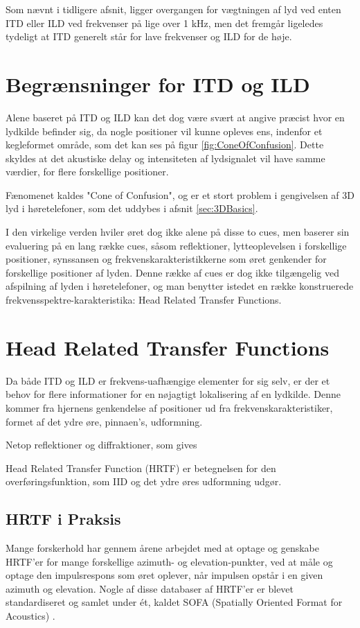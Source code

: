 Som nævnt i tidligere afsnit, ligger overgangen for vægtningen af lyd ved enten ITD eller ILD ved frekvenser på lige over 1 kHz, men det fremgår ligeledes tydeligt at ITD generelt står for lave frekvenser og ILD for de høje.

\section{Begrænsninger for ITD og ILD} 
Alene baseret på ITD og ILD kan det dog være svært at angive præcist hvor en lydkilde befinder sig, da nogle positioner vil kunne opleves ens, indenfor et kegleformet område, som det kan ses på figur \ref{fig:ConeOfConfusion}. Dette skyldes at det akustiske delay og intensiteten af lydsignalet vil have samme værdier, for flere forskellige positioner. 


Fænomenet kaldes "Cone of Confusion", og er et stort problem i gengivelsen af 3D lyd i høretelefoner, som det uddybes i afsnit \ref{sec:3DBasics}. 

I den virkelige verden hviler øret dog ikke alene på disse to cues, men baserer sin evaluering på en lang række cues, såsom reflektioner, lytteoplevelsen i forskellige positioner, synssansen og frekvenskarakteristikkerne som øret genkender for forskellige positioner af lyden. Denne række af cues er dog ikke tilgængelig ved afspilning af lyden i høretelefoner, og man benytter istedet en række konstruerede frekvensspektre-karakteristika: Head Related Transfer Functions.

\section{Head Related Transfer Functions}
\label{sec:HRTF}

Da både ITD og ILD er frekvens-uafhængige elementer for sig selv, er der et behov for flere informationer for en nøjagtigt lokalisering af en lydkilde. Denne kommer fra hjernens genkendelse af positioner ud fra frekvenskarakteristiker, formet af det ydre øre, pinnaen's, udformning. 

Netop reflektioner og diffraktioner, som gives 

Head Related Transfer Function (HRTF) er betegnelsen for den overføringsfunktion, som IID og det ydre øres udformning udgør. 


\subsection{HRTF i Praksis}
Mange forskerhold har gennem årene arbejdet med at optage og genskabe HRTF'er for mange forskellige azimuth- og elevation-punkter, ved at måle og optage den impulsrespons som øret oplever, når impulsen opstår i en given azimuth og elevation. Nogle af disse databaser af HRTF'er er blevet standardiseret og samlet under ét, kaldet SOFA (Spatially Oriented Format for Acoustics) \cite{SOFA}. 


